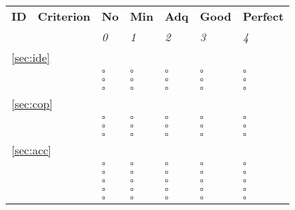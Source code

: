 \documentclass[a4paper,11pt]{article}
\begin{document}
\begin{table}[hbt]
	\begin{tabular}
		{ p{} | 
		  p{} |
		  p{} |
		  p{} |
		  p{} |
		  p{} |
		  p{} }
		\hline
		\textbf{ID} & \textbf{Criterion} & \textbf{No} & \textbf{Min} & \textbf{Adq} & \textbf{Good} & \textbf{Perfect} \\
                                        & & \emph{0} & \emph{1} & \emph{2} & \emph{3} & \emph{4} \\
		\hline
		\multicolumn{7}{l}{\ref{sec:ide}{ }\nameref{sec:ide}} \\
		\hline
		\hyperref[id:ID1]{\idOneID} & \idOneText & $\square$ & $\square$ & $\square$ & $\square$ & $\square$ \\
		\hyperref[id:ID2]{\idTwoID} & \idTwoText & $\square$ & $\square$ & $\square$ & $\square$ & $\square$ \\
		\hyperref[id:ID3]{\idThreeID} & \idThreeText & $\square$ & $\square$ & $\square$ & $\square$ & $\square$ \\
		\hline
		\multicolumn{7}{l}{\ref{sec:cop}{ }\nameref{sec:cop}} \\
		\hline
		\hyperref[id:CP1]{\cpOneID} & \cpOneText & $\square$ & $\square$ & $\square$ & $\square$ & $\square$ \\
		\hyperref[id:CP2]{\cpTwoID} & \cpTwoText & $\square$ & $\square$ & $\square$ & $\square$ & $\square$ \\
		\hyperref[id:CP3]{\cpThreeID} & \cpThreeText & $\square$ & $\square$ & $\square$ & $\square$ & $\square$ \\
		\hline
		\multicolumn{7}{l}{\ref{sec:acc}{ }\nameref{sec:acc}} \\
		\hline
		\hyperref[id:AC1]{\acOneID} & \acOneText & $\square$ & $\square$ & $\square$ & $\square$ & $\square$ \\
		\hyperref[id:AC2]{\acTwoID} & \acTwoText & $\square$ & $\square$ & $\square$ & $\square$ & $\square$ \\
		\hyperref[id:AC3]{\acThreeID} & \acThreeText & $\square$ & $\square$ & $\square$ & $\square$ & $\square$ \\
		\hyperref[id:AC4]{\acFourID} & \acFourText & $\square$ & $\square$ & $\square$ & $\square$ & $\square$ \\
		\hyperref[id:AC5]{\acFiveID} & \acFiveText & $\square$ & $\square$ & $\square$ & $\square$ & $\square$ \\

\end{tabular}
\end{table}
\end{document}
